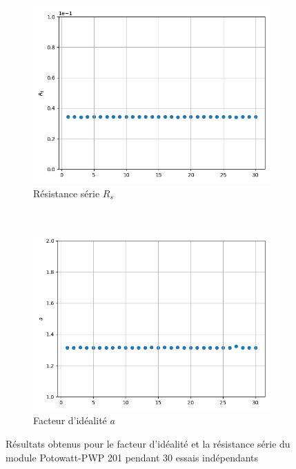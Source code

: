 \begin{figure}
    \centering
    \begin{subfigure}[b]{0.49\textwidth}
        \includegraphics[width=\textwidth]{resources/pwp/rsconsist.png}
        \caption{Résistance série $R_s$}
    \end{subfigure}
    ~
    \begin{subfigure}[b]{0.49\textwidth}
        \includegraphics[width=\textwidth]{resources/pwp/aconsist.png}
        \caption{Facteur d'idéalité $a$}
    \end{subfigure}
    \caption{Résultats obtenus pour le facteur d'idéalité et la résistance série du module Potowatt-PWP 201 pendant 30 essais indépendants}
    \label{fig:paramconsist}
\end{figure}

